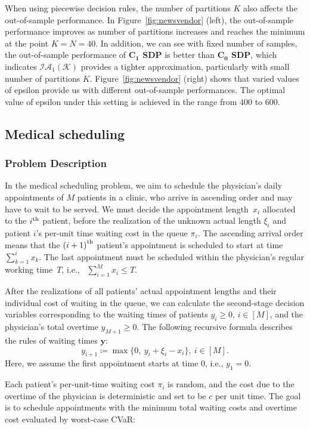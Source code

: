 \documentclass{article}
\begin{document}
When using piecewise decision rules, the number of partitions $K$ also affects the out-of-sample performance. In Figure~\ref{fig:newsvendor} (left), the out-of-sample performance improves as number of partitions increases and reaches the minimum at the point $K = N = 40$. In addition, we can see with fixed number of samples, the out-of-sample performance of \textbf{$\mathbf{C_1}$ SDP} is better than \textbf{$\mathbf{C_0}$ SDP}, which indicates $\mathcal{IA}_1\mathcal{(K)}$ provides a tighter approximation, particularly with small number of partitions $K$.
Figure~\ref{fig:newsvendor} (right) shows that varied values of epsilon provide us with different out-of-sample performances. The optimal value of epsilon under this setting is achieved in the range from 400 to 600.

\subsection{ Medical scheduling}

\subsubsection{Problem Description} 

In the medical scheduling problem, we aim to schedule the physician's daily appointments of $M$ patients in a clinic, who arrive in ascending order and may have to wait to be served. We must decide the appointment length~$x_i$ allocated to the $i^{\textup{th}}$ patient, before the realization of the unknown actual length $\xi_i$ and patient $i$'s per-unit time waiting cost in the queue $\pi_i$. The ascending arrival order means that the ${(i+1)}^{\textup{th}}$ patient's appointment is scheduled to start at time $\sum_{k=1}^{i} x_k$. The last appointment must be scheduled within the physician's regular working time~$T$, i.e., \ $\sum_{i=1}^{M} x_i \leq T$.

After the realizations of all patients' actual appointment lengths and their individual cost of waiting in the queue, we can calculate the second-stage decision variables corresponding to the waiting times of patients $y_i \geq 0$, $i \in [M]$, and the physician's total overtime $y_{M+1} \geq 0$. The following recursive formula describes the rules of waiting times $\bm y$:
$$y_{i+1} \coloneqq \max \{0, \ y_i + \xi_i - x_i\}, \ i \in [M]. $$
Here, we assume the first appointment starts at time 0, i.e., $y_1 = 0$.

Each patient's per-unit-time waiting cost $\pi_i$ is random, and the cost due to the overtime of the physician is deterministic and set to be $c$ per unit time. The goal is to schedule appointments with the minimum total waiting costs and overtime cost evaluated by worst-case CVaR:
\end{document}
